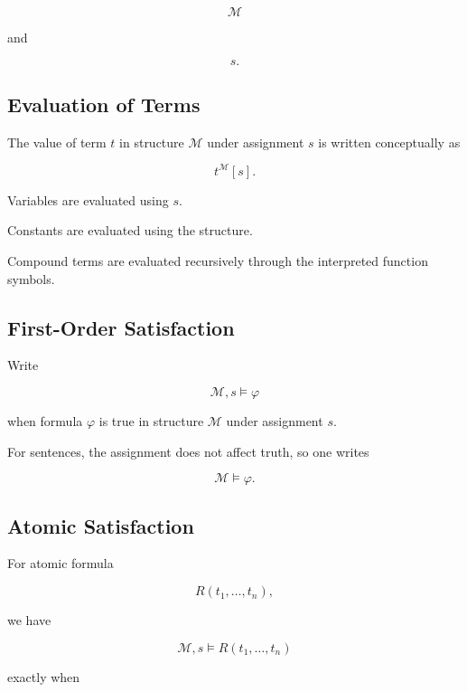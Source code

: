 \[
\boxed{
\mathcal{M}
}
\]

and

\[
\boxed{
s.
}
\]

\subsection{Evaluation of Terms}
\label{subsec:evaluation-of-terms}

The value of term \(t\) in structure \(\mathcal{M}\) under assignment \(s\)
is written conceptually as

\[
\boxed{
t^{\mathcal{M}}[s].
}
\]

Variables are evaluated using \(s\).

Constants are evaluated using the structure.

Compound terms are evaluated recursively through the interpreted function
symbols.

\subsection{First-Order Satisfaction}
\label{subsec:first-order-satisfaction}

Write

\[
\boxed{
\mathcal{M},s
\models
\varphi
}
\]

when formula \(\varphi\) is true in structure \(\mathcal{M}\) under
assignment \(s\).

For sentences, the assignment does not affect truth, so one writes

\[
\boxed{
\mathcal{M}
\models
\varphi.
}
\]

\subsection{Atomic Satisfaction}
\label{subsec:atomic-satisfaction}

For atomic formula

\[
R(t_1,\ldots,t_n),
\]

we have

\[
\boxed{
\mathcal{M},s
\models
R(t_1,\ldots,t_n)
}
\]

exactly when

